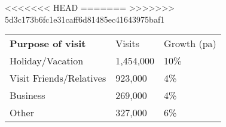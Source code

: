 <<<<<<< HEAD
=======
>>>>>>> 5d3c173b6fc1e31caff6d81485ec41643975baf1
\begin{tabular}[t]{p{4.7cm}>{\hfill}p{1.1cm}>{\hfill}p{1.7cm}}
 \textbf{Purpose of visit} & Visits & Growth (pa) \\ 
 Holiday/Vacation & 1,454,000 & 10\% \\ 
  Visit Friends/Relatives &   923,000 & 4\% \\ 
  Business &   269,000 & 4\% \\ 
  Other & 327,000 & 6\% \\ 
  \end{tabular}
